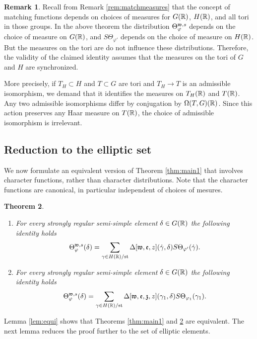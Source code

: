 \documentclass{article}
\newtheorem{thm}{Theorem}[subsection]
\theoremstyle{definition}
\newtheorem{rem}[thm]{Remark}
\numberwithin{equation}{section}
\renewcommand{\-}{\hyp{}}
\begin{document}
\begin{rem} \label{rem:measures}
	Recall from Remark \ref{rem:matchmeasures} that the concept of matching functions depends on choices of measures for $G(\mathbb{R})$, $H(\mathbb{R})$, and all tori in those groups. In the above theorem the distribution $\Theta^{\mathfrak{w},s}_\varphi$ depends on the choice of measure on $G(\mathbb{R})$, and $S\Theta_{\varphi'}$ depends on the choice of measure on $H(\mathbb{R})$. But the measures on the tori are do not influence these distributions. Therefore, the validity of the claimed identity assumes that the measures on the tori of $G$ and $H$ are synchronized.

	More precisely, if $T_H \subset H$ and $T \subset G$ are tori and $T_H \to T$ is an admissible isomorphism, we demand that it identifies the measures  on $T_H(\mathbb{R})$ and $T(\mathbb{R})$. Any two admissible isomorphisms differ by conjugation by $\Omega(T,G)(\mathbb{R})$. Since this action preserves any Haar measure on $T(\mathbb{R})$, the choice of admissible isomorphism is irrelevant.
\end{rem}

\subsection{Reduction to the elliptic set}

We now formulate an equivalent version of Theorem \ref{thm:main1} that involves character functions, rather than character distributions. Note that the character functions are canonical, in particular independent of choices of mesures.

\begin{thm} \label{thm:main2}
\begin{enumerate}
	\item For every strongly regular semi-simple element $\delta \in G(\mathbb{R})$ the following identity holds
	\[ \Theta_\varphi^{\mathfrak{w},s}(\delta) = \sum_{\gamma \in H(\mathbb{R})/\textrm{st}} \Delta[\mathfrak{w},\mathfrak{e},z](\dot\gamma,\delta)S\Theta_{\varphi'}(\dot\gamma). \]
	\item For every strongly regular semi-simple element $\delta \in G(\mathbb{R})$ the following identity holds
	\[ \Theta_\varphi^{\mathfrak{w},s}(\delta) = \sum_{\gamma \in H(\mathbb{R})/\textrm{st}} \Delta[\mathfrak{w},\mathfrak{e},\mathfrak{z},z](\gamma_1,\delta)S\Theta_{\varphi_1}(\gamma_1). \]
\end{enumerate}
\end{thm}

Lemma \ref{lem:equi} shows that Theorems \ref{thm:main1} and \ref{thm:main2} are equivalent. The next lemma reduces the proof further to the set of elliptic elements.
\end{document}
